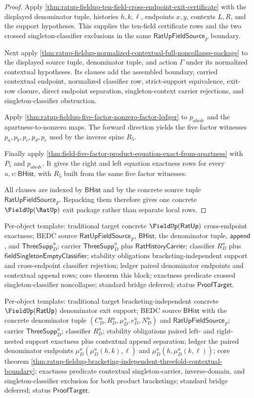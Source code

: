 \begin{proof}
Apply
\autoref{thm:ratup-fieldup-ten-field-cross-endpoint-exit-certificate} with the
displayed denominator tuple, histories $h,k,\ell$, endpoints $x,y$, contexts
$L,R$, and the support hypotheses. This supplies the ten-field certificate rows
and the two crossed singleton-classifier exclusions in the same
$\mathsf{RatUpFieldSource}_F$ boundary.

Next apply
\autoref{thm:ratup-fieldup-normalized-contextual-full-noncollapse-package} to the
displayed source tuple, denominator tuple, and action $\Gamma$ under its
normalized contextual hypotheses. Its clauses add the assembled boundary,
carried contextual endpoint, normalized classifier row, strict-support
equivalence, exit-row closure, direct endpoint separation, singleton-context
carrier rejections, and singleton-classifier obstruction.

Apply
\autoref{thm:ratup-fieldup-five-factor-nonzero-factor-ledger} to
$p_{abcde}$ and the apartness-to-nonzero maps. The forward direction yields the
five factor witnesses $p_a,p_b,p_c,p_d,p_e$ used by the inverse spine $R_5$.

Finally apply
\autoref{thm:field-five-factor-product-equation-exact-from-apartness} with
$P_5$ and $p_{abcde}$. It gives the right and left equation exactness rows for
every $u,v:\mathsf{BHist}$, with $R_5$ built from the same five factor
witnesses.

All clauses are indexed by $\mathsf{BHist}$ and by the concrete source tuple
$\mathsf{RatUpFieldSource}_F$. Repacking them therefore gives one concrete
$\FieldUp(\RatUp)$ exit package rather than separate local rows.
\end{proof}

Per-object template: traditional target concrete $\FieldUp(\mathsf{RatUp})$
cross-endpoint exactness; BEDC source $\mathsf{RatUpFieldSource}_F$,
$\mathsf{BHist}$, the denominator tuple, $\mathsf{append}$, and
$\mathsf{ThreeSupp}_D^u$; carrier $\mathsf{ThreeSupp}_D^u$ plus
$\mathsf{RatHistoryCarrier}$; classifier $R_D^u$ plus
$\mathsf{fieldSingletonEmptyClassifier}$; stability obligations
bracketing-independent support and cross-endpoint classifier rejection; ledger
paired denominator endpoints and contextual append rows; core theorem this
block; exactness predicate crossed singleton-classifier noncollapse; standard
bridge deferred; status $\mathsf{ProofTarget}$.

Per-object template: traditional target bracketing-independent concrete
$\FieldUp(\mathsf{RatUp})$ denominator exit support; BEDC source
$\mathsf{BHist}$ with the concrete denominator tuple
$(C_D^u,R_D^u,\mu_D^u,e_D^u,N_D^u)$ and $\mathsf{RatUpFieldSource}_F$; carrier
$\mathsf{ThreeSupp}_D^u$; classifier $R_D^u$; stability obligations paired
left- and right-nested support exactness plus contextual append separation;
ledger the paired denominator endpoints $\mu_D^u(\mu_D^u(h,k),\ell)$ and
$\mu_D^u(h,\mu_D^u(k,\ell))$; core theorem
\autoref{thm:ratup-fieldup-bracketing-independent-threefold-contextual-boundary};
exactness predicate contextual singleton-carrier, inverse-domain, and
singleton-classifier exclusion for both product bracketings; standard bridge
deferred; status $\mathsf{ProofTarget}$.
